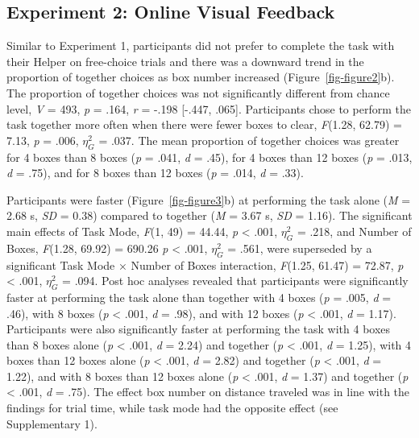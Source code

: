 \documentclass[
  11pt,
  letterpaper,
]{article}
\renewcommand{\emph}[1]{\textit{#1}}  %
\begin{document}
\clearpage

\subsection{Experiment 2: Online Visual
Feedback}\label{experiment-2-online-visual-feedback-1}

Similar to Experiment 1, participants did not prefer to complete the
task with their Helper on free-choice trials and there was a downward
trend in the proportion of together choices as box number increased
(Figure~\ref{fig-figure2}b). The proportion of together choices was not
significantly different from chance level, \emph{V} = 493, \emph{p} =
.164, \emph{r} = -.198 {[}-.447, .065{]}. Participants chose to perform
the task together more often when there were fewer boxes to clear,
\emph{F}(1.28, 62.79) = 7.13, \emph{p} = .006, \(\eta_{G}^{2}\) = .037.
The mean proportion of together choices was greater for 4 boxes than 8
boxes (\emph{p} = .041, \emph{d} = .45), for 4 boxes than 12 boxes
(\emph{p} = .013, \emph{d} = .75), and for 8 boxes than 12 boxes
(\emph{p} = .014, \emph{d} = .33).

Participants were faster (Figure~\ref{fig-figure3}b) at performing the
task alone (\emph{M} = 2.68 s, \emph{SD} = 0.38) compared to together
(\emph{M} = 3.67 s, \emph{SD} = 1.16). The significant main effects of
Task Mode, \emph{F}(1, 49) = 44.44, \emph{p} \textless{} .001,
\(\eta_{G}^{2}\) = .218, and Number of Boxes, \emph{F}(1.28, 69.92) =
690.26 \emph{p} \textless{} .001, \(\eta_{G}^{2}\) = .561, were
superseded by a significant Task Mode × Number of Boxes interaction,
\emph{F}(1.25, 61.47) = 72.87, \emph{p} \textless{} .001,
\(\eta_{G}^{2}\) = .094. Post hoc analyses revealed that participants
were significantly faster at performing the task alone than together
with 4 boxes (\emph{p} = .005, \emph{d} = .46), with 8 boxes (\emph{p}
\textless{} .001, \emph{d} = .98), and with 12 boxes (\emph{p}
\textless{} .001, \emph{d} = 1.17). Participants were also significantly
faster at performing the task with 4 boxes than 8 boxes alone (\emph{p}
\textless{} .001, \emph{d} = 2.24) and together (\emph{p} \textless{}
.001, \emph{d} = 1.25), with 4 boxes than 12 boxes alone (\emph{p}
\textless{} .001, \emph{d} = 2.82) and together (\emph{p} \textless{}
.001, \emph{d} = 1.22), and with 8 boxes than 12 boxes alone (\emph{p}
\textless{} .001, \emph{d} = 1.37) and together (\emph{p} \textless{}
.001, \emph{d} = .75). The effect box number on distance traveled was in
line with the findings for trial time, while task mode had the opposite
effect (see Supplementary 1).
\end{document}
